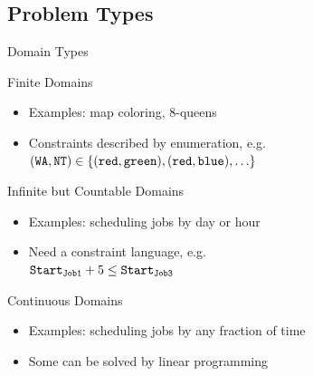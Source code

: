 \documentclass[12pt]{beamer}
\newcommand{\V}[1]{\mbox{\texttt{#1}}}
\begin{document}
\subsection{Problem Types}
\begin{frame}{Domain Types}
	\begin{block}{Finite Domains}
		\begin{itemize}
			\item Examples: map coloring, 8-queens
			\item Constraints described by enumeration, e.g. \\
			      $(\V{WA}, \V{NT}) \in \{(\V{red}, \V{green}), (\V{red}, \V{blue}), \ldots\}$
		\end{itemize}
	\end{block}
	\pause
	\begin{block}{Infinite but Countable Domains}
		\begin{itemize}
			\item Examples: scheduling jobs by day or hour
			\item Need a constraint language, e.g. \\
			      $\V{Start}_{\V{\scriptsize Job1}} + 5 \leq \V{Start}_{\V{\scriptsize Job3}}$
		\end{itemize}
	\end{block}
	\pause
	\begin{block}{Continuous Domains}
		\begin{itemize}
			\item Examples: scheduling jobs by any fraction of time
			\item Some can be solved by linear programming
		\end{itemize}
	\end{block}
\end{frame}
\end{document}
